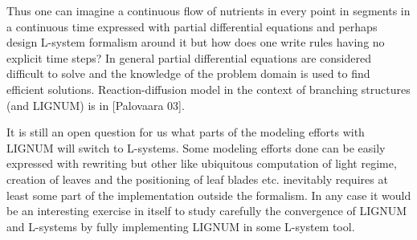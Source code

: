 Thus one can imagine a continuous  flow of nutrients in every point in
segments  in a  continuous  time expressed  with partial  differential
equations and perhaps design L-system formalism around it but how does
one write  rules having  no explicit time  steps?  In  general partial
differential  equations  are considered  difficult  to  solve and  the
knowledge of the  problem domain is used to  find efficient solutions.
Reaction-diffusion model  in the context of  branching structures (and
LIGNUM) is in [Palovaara 03]. 

It is still an open question for us what parts of the modeling efforts
with LIGNUM will switch to  L-systems.  Some modeling efforts done can
be  easily   expressed  with  rewriting  but   other  like  ubiquitous
computation of light regime, creation of leaves and the positioning of
leaf  blades etc.   inevitably  requires  at least  some  part of  the
implementation  outside the  formalism.  In  any case  it would  be an
interesting exercise  in itself to study carefully  the convergence of
LIGNUM  and L-systems by  fully implementing  LIGNUM in  some L-system
tool.


